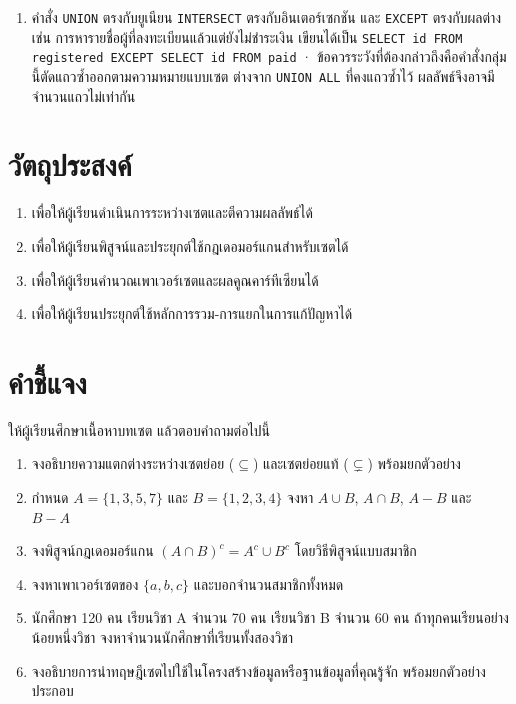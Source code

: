 \begin{enumerate}
    \item คำสั่ง \texttt{UNION} ตรงกับยูเนียน \texttt{INTERSECT} ตรงกับอินเตอร์เซกชัน และ \texttt{EXCEPT} ตรงกับผลต่าง เช่น การหารายชื่อผู้ที่ลงทะเบียนแล้วแต่ยังไม่ชำระเงิน เขียนได้เป็น \texttt{SELECT id FROM registered EXCEPT SELECT id FROM paid} · ข้อควรระวังที่ต้องกล่าวถึงคือคำสั่งกลุ่มนี้ตัดแถวซ้ำออกตามความหมายแบบเซต ต่างจาก \texttt{UNION ALL} ที่คงแถวซ้ำไว้ ผลลัพธ์จึงอาจมีจำนวนแถวไม่เท่ากัน
\end{enumerate}

\newpage
{}
\section*{วัตถุประสงค์}
\begin{enumerate}
    \item เพื่อให้ผู้เรียนดำเนินการระหว่างเซตและตีความผลลัพธ์ได้
    \item เพื่อให้ผู้เรียนพิสูจน์และประยุกต์ใช้กฎเดอมอร์แกนสำหรับเซตได้
    \item เพื่อให้ผู้เรียนคำนวณเพาเวอร์เซตและผลคูณคาร์ทีเซียนได้
    \item เพื่อให้ผู้เรียนประยุกต์ใช้หลักการรวม-การแยกในการแก้ปัญหาได้
\end{enumerate}
\section*{คำชี้แจง} ให้ผู้เรียนศึกษาเนื้อหาบทเซต แล้วตอบคำถามต่อไปนี้
\begin{enumerate}
    \item จงอธิบายความแตกต่างระหว่างเซตย่อย ($\subseteq$) และเซตย่อยแท้ ($\subsetneq$) พร้อมยกตัวอย่าง
    \item กำหนด $A = \{1, 3, 5, 7\}$ และ $B = \{1, 2, 3, 4\}$ จงหา $A \cup B$, $A \cap B$, $A - B$ และ $B - A$
    \item จงพิสูจน์กฎเดอมอร์แกน $(A \cap B)^c = A^c \cup B^c$ โดยวิธีพิสูจน์แบบสมาชิก
    \item จงหาเพาเวอร์เซตของ $\{a, b, c\}$ และบอกจำนวนสมาชิกทั้งหมด
    \item นักศึกษา 120 คน เรียนวิชา A จำนวน 70 คน เรียนวิชา B จำนวน 60 คน ถ้าทุกคนเรียนอย่างน้อยหนึ่งวิชา จงหาจำนวนนักศึกษาที่เรียนทั้งสองวิชา
    \item จงอธิบายการนำทฤษฎีเซตไปใช้ในโครงสร้างข้อมูลหรือฐานข้อมูลที่คุณรู้จัก พร้อมยกตัวอย่างประกอบ
\end{enumerate}
